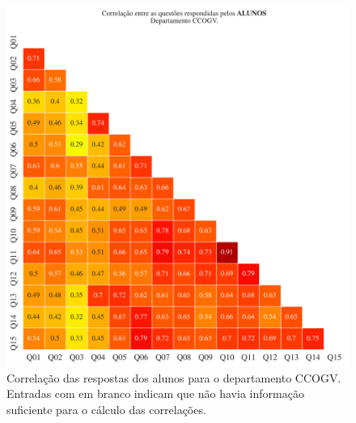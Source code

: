 \documentclass[a4paper,10pt]{article}
\begin{document}
\begin{figure}[h]
\centering
\includegraphics[width=0.999\linewidth]{matriz_corr__CCOGV_alunos.png}
\caption{\label{fig:corr_alunos}Correlação das respostas dos alunos para o departamento CCOGV. Entradas com em branco indicam que não havia informação suficiente para o cálculo das correlações.}
\end{figure}
\end{document}
